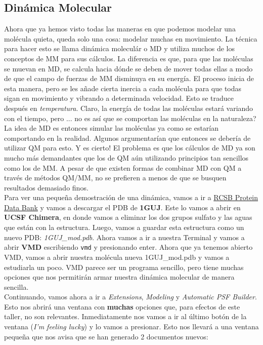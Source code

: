 \documentclass[10pt,letterpaper]{article}
\newcommand{\inlinecode}[1]{
\colorbox{light-gray}{\texttt{#1}}
}
\begin{document}
\subsection{Din\'amica Molecular}
Ahora que ya hemos visto todas las maneras en que podemos modelar una mol\'ecula quieta, queda solo una cosa: modelar muchas en movimiento. La t\'ecnica para hacer esto se llama din\'amica molecul\'ar o MD y utiliza muchos de los conceptos de MM para sus c\'alculos. La diferencia es que, para que las mol\'eculas se muevan en MD, se calcula hacia d\'onde se deben de mover todas ellas a modo de que el campo de fuerzas de MM disminuya en su energ\'ia. El proceso inicia de esta manera, pero se les a\~nade cierta inercia a cada mol\'ecula para que todas sigan en movimiento y vibrando a determinada velocidad. Esto se traduce despu\'es en \emph{temperatura}. Claro, la energ\'ia de todas las mol\'eculas estar\'a variando con el tiempo, pero ... no es as\'i que se comportan las mol\'eculas en la naturaleza?\\

La idea de MD es entonces simular las mol\'eculas ya como se estar\'ian comportando en la realidad. Algunos argumentar\'ian que entonces se deber\'ia de utilizar QM para esto. Y es cierto! El problema es que los c\'alculos de MD ya son mucho m\'as demandantes que los de QM a\'un utilizando principios tan sencillos como los de MM. A pesar de que existen formas de combinar MD con QM a trav\'es de m\'etodos QM/MM, no se prefieren a menos de que se busquen resultados demasiado finos.\\

Para ver una peque\~na demostraci\'on de una din\'amica, vamos a ir a \href{http://www.rcsb.org/pdb/home/home.do}{RCSB Protein Data Bank} y vamos a descargar el PDB de \textbf{1GUJ}. Este lo vamos a abrir en \textbf{UCSF Chimera}, en donde vamos a eliminar los dos grupos sulfato y las aguas que est\'an con la estructura. Luego, vamos a guardar esta estructura como un nuevo PDB: \textit{1GUJ\_mod.pdb}. Ahora vamos a ir a nuestra Terminal y vamos a abrir \textbf{VMD} escribiendo \inlinecode{vmd} y presionando enter. Ahora que ya tenemos abierto VMD, vamos a abrir nuestra mol\'ecula nueva 1GUJ\_mod.pdb y vamos a estudiarla un poco. VMD parece ser un programa sencillo, pero tiene muchas opciones que nos permitir\'an armar nuestra din\'amica molecular de manera sencilla.\\

Continuando, vamos ahora a ir a \textit{Extensions}, \textit{Modeling} y \textit{Automatic PSF Builder}. Esto nos abrir\'a una ventana con \textbf{muchas} opciones que, para efectos de este taller, no son relevantes. Inmediatamente nos vamos a ir al \'ultimo bot\'on de la ventana (\textit{I'm feeling lucky}) y lo vamos a presionar. Esto nos llevar\'a a una ventana peque\~na que nos avisa que se han generado 2 documentos nuevos:
\end{document}
